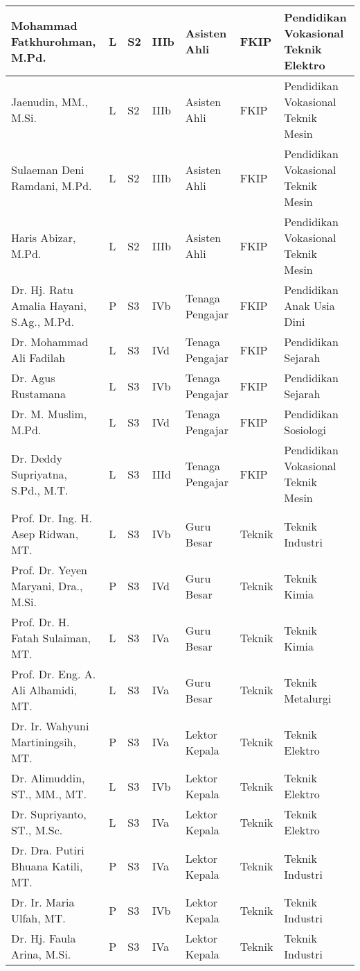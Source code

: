 \documentclass[
]{book}
\begin{document}
\begin{longtable}{l|l|l|l|l|l|l}
\hline
Mohammad Fatkhurohman, M.Pd. & L & S2 & IIIb & Asisten Ahli & FKIP & Pendidikan Vokasional Teknik Elektro\\
\hline
Jaenudin, MM., M.Si. & L & S2 & IIIb & Asisten Ahli & FKIP & Pendidikan Vokasional Teknik Mesin\\
\hline
Sulaeman Deni Ramdani, M.Pd. & L & S2 & IIIb & Asisten Ahli & FKIP & Pendidikan Vokasional Teknik Mesin\\
\hline
Haris Abizar, M.Pd. & L & S2 & IIIb & Asisten Ahli & FKIP & Pendidikan Vokasional Teknik Mesin\\
\hline
Dr. Hj. Ratu Amalia Hayani, S.Ag., M.Pd. & P & S3 & IVb & Tenaga Pengajar & FKIP & Pendidikan Anak Usia Dini\\
\hline
Dr. Mohammad Ali Fadilah & L & S3 & IVd & Tenaga Pengajar & FKIP & Pendidikan Sejarah\\
\hline
Dr. Agus Rustamana & L & S3 & IVb & Tenaga Pengajar & FKIP & Pendidikan Sejarah\\
\hline
Dr. M. Muslim, M.Pd. & L & S3 & IVd & Tenaga Pengajar & FKIP & Pendidikan Sosiologi\\
\hline
Dr. Deddy Supriyatna, S.Pd., M.T. & L & S3 & IIId & Tenaga Pengajar & FKIP & Pendidikan Vokasional Teknik Mesin\\
\hline
Prof. Dr. Ing. H. Asep Ridwan, MT. & L & S3 & IVb & Guru Besar & Teknik & Teknik Industri\\
\hline
Prof. Dr. Yeyen Maryani, Dra., M.Si. & P & S3 & IVd & Guru Besar & Teknik & Teknik Kimia\\
\hline
Prof. Dr. H. Fatah Sulaiman, MT. & L & S3 & IVa & Guru Besar & Teknik & Teknik Kimia\\
\hline
Prof. Dr. Eng. A. Ali Alhamidi, MT. & L & S3 & IVa & Guru Besar & Teknik & Teknik Metalurgi\\
\hline
Dr. Ir. Wahyuni Martiningsih, MT. & P & S3 & IVa & Lektor Kepala & Teknik & Teknik Elektro\\
\hline
Dr. Alimuddin, ST., MM., MT. & L & S3 & IVb & Lektor Kepala & Teknik & Teknik Elektro\\
\hline
Dr. Supriyanto, ST., M.Sc. & L & S3 & IVa & Lektor Kepala & Teknik & Teknik Elektro\\
\hline
Dr. Dra. Putiri Bhuana Katili, MT. & P & S3 & IVa & Lektor Kepala & Teknik & Teknik Industri\\
\hline
Dr. Ir. Maria Ulfah, MT. & P & S3 & IVb & Lektor Kepala & Teknik & Teknik Industri\\
\hline
Dr. Hj. Faula Arina, M.Si. & P & S3 & IVa & Lektor Kepala & Teknik & Teknik Industri\\

\end{longtable}
\end{document}
